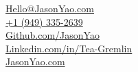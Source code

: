 \documentclass[]{two-column-resume}
\begin{document}
{
    \large  %
    \faEnvelope \hspace{0.1cm} \href{mailto:Hello@JasonYao.com}{Hello@JasonYao.com}\\
    \faPhone \hspace{0.1cm} \href{tel:+1-949-335-2639}{+1 (949) 335-2639} \\
    \faGithub \hspace{0.1cm} \href{https://Github.com/JasonYao}{Github.com/JasonYao}\\
    \faLinkedin \hspace{0.1cm} \href{https://www.Linkedin.com/in/Tea-Gremlin}{Linkedin.com/in/Tea-Gremlin}\\
    \faGlobe \hspace{0.1cm} \href{https://www.JasonYao.com}{JasonYao.com}
}
\end{document}
